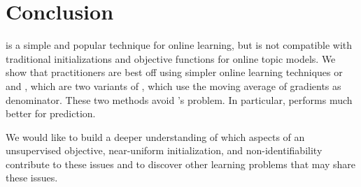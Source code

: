\section{Conclusion}
\label{sec:conclusion}

 is a simple and popular technique for online learning,
but is not compatible with traditional initializations and objective
functions for online topic models.  We show that practitioners are
best off using simpler online learning techniques or  and
, which are two variants of , which use the moving average of
gradients as denominator. These two methods avoid 's problem. In
particular,  performs much better for prediction.

We would like to build a deeper understanding of which aspects of an
unsupervised objective, near-uniform initialization, and
non-identifiability contribute to these issues and to discover other
learning problems that may share these issues.